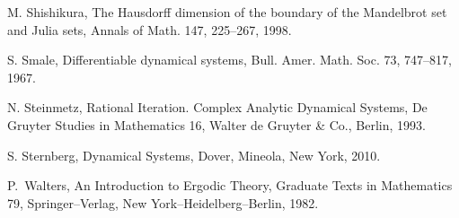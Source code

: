 \documentclass[12pt]{article}
\theoremstyle{definition}
\theoremstyle{remark}
\begin{document}
\begin{thebibliography}{200000}



M. Shishikura,
The Hausdorff dimension of the boundary of the Mandelbrot set and Julia sets,
Annals of Math. 147, 225--267, 1998.


S. Smale, Differentiable dynamical systems, Bull. Amer. Math. Soc. 73,
747--817, 1967.

N. Steinmetz, Rational Iteration. Complex Analytic Dynamical Systems,
De Gruyter Studies in Mathematics 16, Walter de Gruyter \& Co., Berlin, 1993.

S. Sternberg, Dynamical Systems, Dover, Mineola, New York, 2010.


P.~Walters,
\newblock An Introduction to Ergodic Theory,
\newblock Graduate Texts in Mathematics 79, Springer--Verlag, New York--Heidelberg--Berlin, 1982.


\end{thebibliography}
\end{document}
